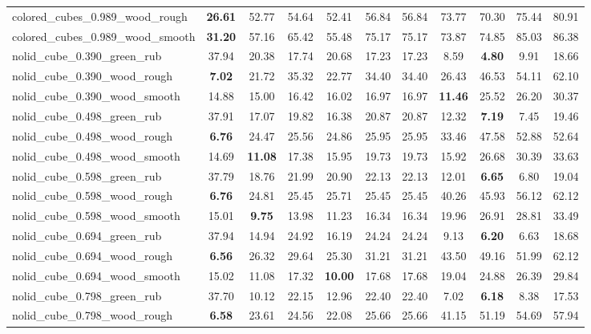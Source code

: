 \begin{table}[H]
{\begin{tabular}{l cccccccccc}
        colored\_cubes\_0.989\_wood\_rough & \textbf{26.61} & 52.77 & 54.64 & 52.41 & 56.84 & 56.84 & 73.77 & 70.30 & 75.44 & 80.91 \\
        colored\_cubes\_0.989\_wood\_smooth & \textbf{31.20} & 57.16 & 65.42 & 55.48 & 75.17 & 75.17 & 73.87 & 74.85 & 85.03 & 86.38 \\
        nolid\_cube\_0.390\_green\_rub & 37.94 & 20.38 & 17.74 & 20.68 & 17.23 & 17.23 & 8.59 & \textbf{4.80} & 9.91 & 18.66 \\
        nolid\_cube\_0.390\_wood\_rough & \textbf{7.02} & 21.72 & 35.32 & 22.77 & 34.40 & 34.40 & 26.43 & 46.53 & 54.11 & 62.10 \\
        nolid\_cube\_0.390\_wood\_smooth & 14.88 & 15.00 & 16.42 & 16.02 & 16.97 & 16.97 & \textbf{11.46} & 25.52 & 26.20 & 30.37 \\
        nolid\_cube\_0.498\_green\_rub & 37.91 & 17.07 & 19.82 & 16.38 & 20.87 & 20.87 & 12.32 & \textbf{7.19} & 7.45 & 19.46 \\
        nolid\_cube\_0.498\_wood\_rough & \textbf{6.76} & 24.47 & 25.56 & 24.86 & 25.95 & 25.95 & 33.46 & 47.58 & 52.88 & 52.64 \\
        nolid\_cube\_0.498\_wood\_smooth & 14.69 & \textbf{11.08} & 17.38 & 15.95 & 19.73 & 19.73 & 15.92 & 26.68 & 30.39 & 33.63 \\
        nolid\_cube\_0.598\_green\_rub & 37.79 & 18.76 & 21.99 & 20.90 & 22.13 & 22.13 & 12.01 & \textbf{6.65} & 6.80 & 19.04 \\
        nolid\_cube\_0.598\_wood\_rough & \textbf{6.76} & 24.81 & 25.45 & 25.71 & 25.45 & 25.45 & 40.26 & 45.93 & 56.12 & 62.12 \\
        nolid\_cube\_0.598\_wood\_smooth & 15.01 & \textbf{9.75} & 13.98 & 11.23 & 16.34 & 16.34 & 19.96 & 26.91 & 28.81 & 33.49 \\
        nolid\_cube\_0.694\_green\_rub & 37.94 & 14.94 & 24.92 & 16.19 & 24.24 & 24.24 & 9.13 & \textbf{6.20} & 6.63 & 18.68 \\
        nolid\_cube\_0.694\_wood\_rough & \textbf{6.56} & 26.32 & 29.64 & 25.30 & 31.21 & 31.21 & 43.50 & 49.16 & 51.99 & 62.12 \\
        nolid\_cube\_0.694\_wood\_smooth & 15.02 & 11.08 & 17.32 & \textbf{10.00} & 17.68 & 17.68 & 19.04 & 24.88 & 26.39 & 29.84 \\
        nolid\_cube\_0.798\_green\_rub & 37.70 & 10.12 & 22.15 & 12.96 & 22.40 & 22.40 & 7.02 & \textbf{6.18} & 8.38 & 17.53 \\
        nolid\_cube\_0.798\_wood\_rough & \textbf{6.58} & 23.61 & 24.56 & 22.08 & 25.66 & 25.66 & 41.15 & 51.19 & 54.69 & 57.94 \\

\end{tabular}}
\end{table}
